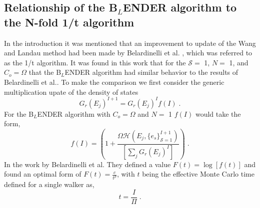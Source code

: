\documentclass[aps,pre,reprint,superscriptaddress,showkeys]{revtex4-1}
\begin{document}
\subsection{Relationship of the B$_L$ENDER algorithm to the N-fold 1/t algorithm}
\label{test_wl}
In the introduction it was mentioned that an improvement to update of the Wang and Landau method had been made by Belardinelli et al. \cite{saturation}, which was referred to as the 1/t algorithm. It was found in this work that for the $\mathcal{S}=$ 1, $N=$ 1, and $C_{o}=\Omega$ that the B$_L$ENDER algorithm had similar behavior to the results of Belardinelli et al.. To make the comparison we first consider the generic multiplication upate of the density of states
\begin{equation}
G_{r}(E_j)^{I+1} = G_{r}(E_j)^{I}f(I)\;.
\label{orignialform}
\end{equation}
For the B$_L$ENDER algorithm with $C_o = \Omega$ and $N=$ 1 $f(I)$ would take the form, 
\begin{equation}
f(I) = ( 1 +  \frac{\Omega \mathcal{H}(E_j,\{e_s\}_{\mathcal{S}=1}^{I+1}) }{ [\sum_j G_{r}(E_j)^{I}] } )\;.
\label{fequiv}
\end{equation}
In the work by Belardinelli et al. They defined a value $F(t) = \log[f(t)]$  and found an optimal form of $F(t) = \frac{c}{t^p}$, with $t$ being the effective Monte Carlo time defined for a single walker as,
\begin{equation}
t = \frac{I}{\Pi} \;.
\label{mcstep}
\end{equation} 
\end{document}
